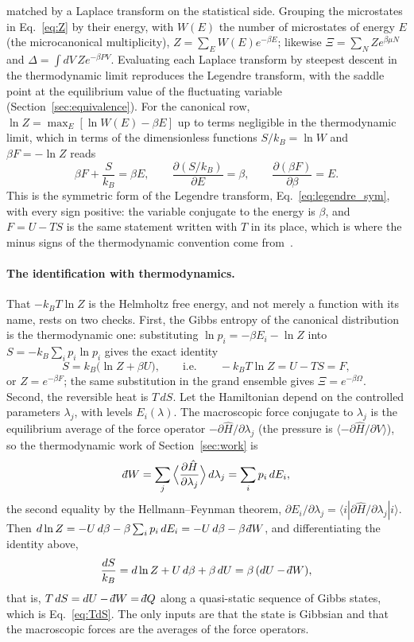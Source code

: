 \documentclass[10pt,a4paper]{article}
\theoremstyle{remark}
\newcommand{\dbar}{\mathchar'26\mkern-11mu d}
\begin{document}
matched by a Laplace transform on the statistical side. Grouping the
microstates in Eq.~\eqref{eq:Z} by their energy, with $W(E)$ the number of
microstates of energy $E$ (the microcanonical multiplicity),
$Z=\sum_EW(E)e^{-\beta E}$; likewise $\Xi=\sum_NZe^{\beta\mu N}$ and
$\Delta=\int dV\,Ze^{-\beta PV}$. Evaluating each
Laplace transform by steepest descent in the thermodynamic limit reproduces the
Legendre transform, with the saddle point at the equilibrium value of the
fluctuating variable (Section~\ref{sec:equivalence}). For the canonical row,
$\ln Z=\max_E[\ln W(E)-\beta E]$ up to terms negligible in the thermodynamic
limit, which in terms of the dimensionless functions $S/k_B=\ln W$ and
$\beta F=-\ln Z$ reads
\[
  \beta F+\frac{S}{k_B}=\beta E ,\qquad
  \frac{\partial(S/k_B)}{\partial E}=\beta ,\qquad
  \frac{\partial(\beta F)}{\partial\beta}=E .
\]
This is the symmetric form of the Legendre transform,
Eq.~\eqref{eq:legendre_sym}, with every sign positive: the variable conjugate
to the energy is $\beta$, and $F=U-TS$ is the same statement written with $T$
in its place, which is where the minus signs of the thermodynamic convention
come from~\cite{Zia}.

\paragraph{The identification with thermodynamics.} That $-k_BT\ln Z$ is the
Helmholtz free energy, and not merely a function with its name, rests on two
checks. First, the Gibbs entropy of the canonical distribution is the
thermodynamic one: substituting $\ln p_i=-\beta E_i-\ln Z$ into
$S=-k_B\sum_ip_i\ln p_i$ gives the exact identity
\[
  S=k_B\big(\ln Z+\beta U\big),\qquad\text{i.e.}\qquad -k_BT\ln Z=U-TS=F ,
\]
or $Z=e^{-\beta F}$; the same substitution in the grand ensemble gives
$\Xi=e^{-\beta\Omega}$. Second, the reversible heat is $T\,dS$. Let the
Hamiltonian depend on the controlled parameters $\lambda_j$, with levels
$E_i(\lambda)$. The macroscopic force conjugate to $\lambda_j$ is the
equilibrium average of the force operator
$-\partial\hat H/\partial\lambda_j$ (the pressure is
$\langle-\partial\hat H/\partial V\rangle$), so the thermodynamic work of
Section~\ref{sec:work} is
\[
  \dbar W=\sum_j\Big\langle\frac{\partial\hat H}{\partial\lambda_j}\Big\rangle\,d\lambda_j
  =\sum_ip_i\,dE_i ,
\]
the second equality by the Hellmann--Feynman theorem,
$\partial E_i/\partial\lambda_j=\langle i|\partial\hat H/\partial\lambda_j|i\rangle$.
Then $d\ln Z=-U\,d\beta-\beta\sum_ip_i\,dE_i=-U\,d\beta-\beta\,\dbar W$, and
differentiating the identity above,
\[
  \frac{dS}{k_B}=d\ln Z+U\,d\beta+\beta\,dU=\beta\,(dU-\dbar W) ,
\]
that is, $T\,dS=dU-\dbar W=\dbar Q$ along a quasi-static sequence of Gibbs
states, which is Eq.~\eqref{eq:TdS}. The only inputs are that the state is
Gibbsian and that the macroscopic forces are the averages of the force
operators.
\end{document}
